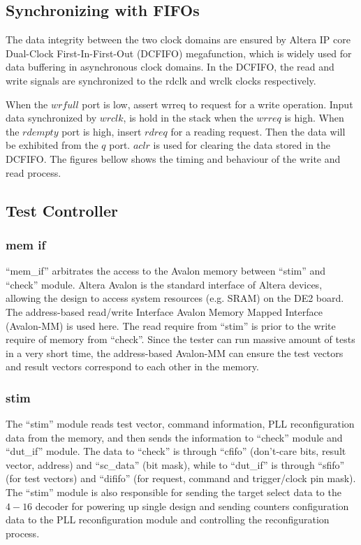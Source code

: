 \subsection{Synchronizing with FIFOs}
The data integrity between the two clock domains are ensured by Altera IP core Dual-Clock First-In-First-Out (DCFIFO) megafunction, which is widely used for data buffering in asynchronous clock domains. In the DCFIFO, the read and write signals are synchronized to the rdclk and wrclk clocks respectively.

When the $wrfull$ port is low, assert wrreq to request for a write operation. Input data synchronized by $wrclk$, is hold in the stack when the $wrreq$ is high. When the $rdempty$ port is high, insert $rdreq$ for a reading request. Then the data will be exhibited from the $q$ port. $aclr$ is used for clearing the data stored in the DCFIFO. The figures bellow shows the timing and behaviour of the write and read process.



\subsection{Test Controller}

\subsubsection{mem if}
``mem\_if'' arbitrates the access to the Avalon memory between ``stim'' and ``check'' module. Altera Avalon is the standard interface of Altera devices, allowing the design to access system resources (e.g. SRAM) on the DE2 board. The address-based read/write Interface Avalon Memory Mapped Interface (Avalon-MM) is used here. The read require from ``stim'' is prior to the write require of memory from ``check''. Since the tester can run massive amount of tests in a very short time, the address-based Avalon-MM can ensure the test vectors and result vectors correspond to each other in the memory.

\subsubsection{stim}
The ``stim'' module reads test vector, command information, PLL reconfiguration data from the memory, and then sends the information to ``check'' module and ``dut\_if'' module. The data to ``check'' is through ``cfifo'' (don’t-care bits, result vector, address) and ``sc\_data'' (bit mask), while to ``dut\_if'' is through ``sfifo'' (for test vectors) and ``dififo'' (for request, command and trigger/clock pin mask). The ``stim'' module is also responsible for sending the target select data to the $4-16$ decoder for powering up single design and sending counters configuration data to the PLL reconfiguration module and controlling the reconfiguration process.


